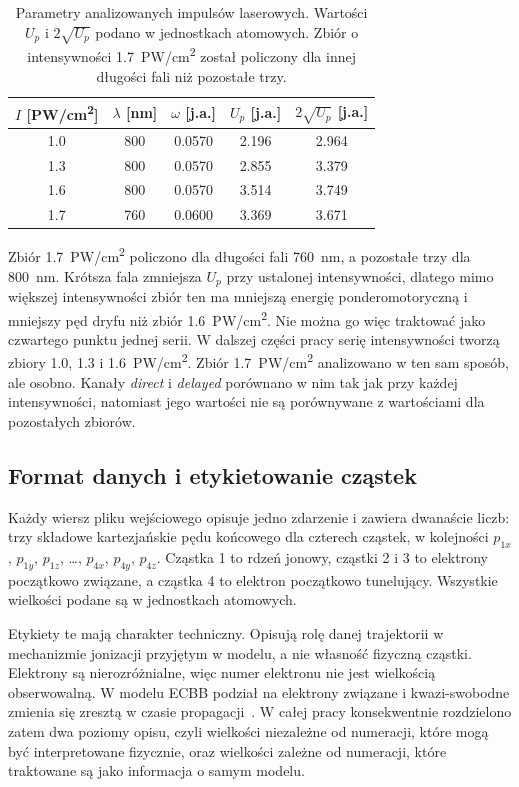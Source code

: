 \documentclass[12pt,a4paper]{article}
\newcommand{\ja}{j.a.}
\newcommand{\PWcm}{PW/cm\textsuperscript{2}}
\begin{document}
\begin{table}[H]
\centering
\caption{Parametry analizowanych impulsów laserowych. Wartości $U_p$ i
$2\sqrt{U_p}$ podano w jednostkach atomowych. Zbiór o intensywności
\num{1.7}~\PWcm{} został policzony dla innej długości fali niż
pozostałe trzy.}
\label{tab:impulsy}
\begin{tabular}{ccccc}
\toprule
$I$ [\PWcm] & $\lambda$ [nm] & $\omega$ [\ja] & $U_p$ [\ja] & $2\sqrt{U_p}$ [\ja] \\
\midrule
\num{1.0} & \num{800} & \num{0.0570} & \num{2.196} & \num{2.964} \\
\num{1.3} & \num{800} & \num{0.0570} & \num{2.855} & \num{3.379} \\
\num{1.6} & \num{800} & \num{0.0570} & \num{3.514} & \num{3.749} \\
\num{1.7} & \num{760} & \num{0.0600} & \num{3.369} & \num{3.671} \\
\bottomrule
\end{tabular}
\end{table}

Zbiór \num{1.7}~\PWcm{} policzono dla długości fali \num{760}~nm,
a pozostałe trzy dla \num{800}~nm. Krótsza fala zmniejsza \(U_p\) przy
ustalonej intensywności, dlatego mimo większej intensywności zbiór ten
ma mniejszą energię ponderomotoryczną i mniejszy pęd dryfu niż zbiór
\num{1.6}~\PWcm{}. Nie można go więc traktować jako czwartego punktu
jednej serii. W dalszej części pracy serię intensywności tworzą zbiory
\num{1.0}, \num{1.3} i \num{1.6}~\PWcm{}. Zbiór \num{1.7}~\PWcm{}
analizowano w ten sam sposób, ale osobno. Kanały \emph{direct}
i \emph{delayed} porównano w nim tak jak przy każdej intensywności,
natomiast jego wartości nie są porównywane z wartościami dla
pozostałych zbiorów.


\subsection{Format danych i etykietowanie cząstek}

Każdy wiersz pliku wejściowego opisuje jedno zdarzenie i zawiera
dwanaście liczb: trzy składowe kartezjańskie pędu końcowego dla
czterech cząstek, w kolejności
$p_{1x}$, $p_{1y}$, $p_{1z}$, \dots, $p_{4x}$, $p_{4y}$, $p_{4z}$. Cząstka 1 to rdzeń
jonowy, cząstki 2 i 3 to elektrony początkowo związane, a
cząstka 4 to elektron początkowo tunelujący. Wszystkie wielkości
podane są w jednostkach atomowych.

Etykiety te mają charakter techniczny. Opisują rolę danej
trajektorii w mechanizmie jonizacji przyjętym w modelu, a nie własność
fizyczną cząstki. Elektrony są nierozróżnialne, więc numer
elektronu nie jest wielkością obserwowalną. W modelu ECBB podział
na elektrony związane i kwazi-swobodne zmienia się zresztą w czasie
propagacji~\cite{Emmanouilidou2023}. W całej pracy konsekwentnie
rozdzielono zatem dwa poziomy opisu, czyli wielkości niezależne od numeracji,
które mogą być interpretowane fizycznie, oraz wielkości zależne od
numeracji, które traktowane są jako informacja o samym modelu.
\end{document}
